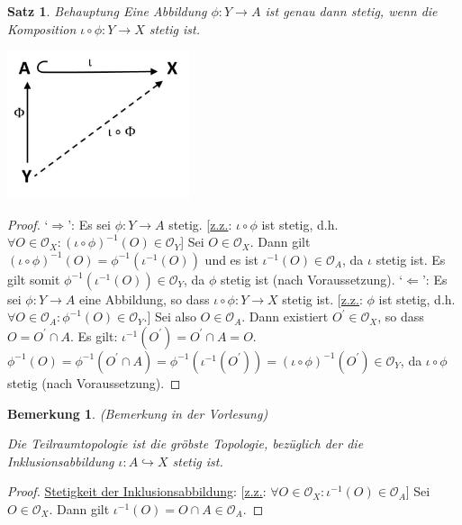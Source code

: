 \documentclass[a4paper,11pt,notitlepage]{report}
\newtheorem{theorem}{Satz}[chapter]
\newtheorem{remark}{Bemerkung}[chapter]
\newcommand{\OO}{{\ensuremath{\mathcal{O}}}}
\begin{document}
\begin{theorem}{Behauptung}
Eine Abbildung $\phi \colon Y \rightarrow A$ ist genau dann stetig, wenn die Komposition $\iota \circ \phi \colon Y \rightarrow X$ stetig ist.
\end{theorem}
\includegraphics[width=0.4\textwidth]{images/Universell_Diagramm.jpg}
\begin{proof}
`$\Rightarrow$': Es sei $\phi \colon Y \rightarrow A$ stetig. [\underline{z.z.}: $\iota \circ \phi$ ist stetig, d.h. $\forall O \in \OO_X \colon (\iota \circ \phi)^{-1}(O) \in \OO_Y$]
\newline
Sei $O \in \OO_X$. Dann gilt $(\iota \circ \phi)^{-1}(O) = \phi^{-1}\left(\iota^{-1}(O)\right)$ und es ist $\iota^{-1}(O) \in \OO_A$, da $\iota$ stetig ist.
\newline
Es gilt somit $\phi^{-1}\left(\iota^{-1}(O)\right) \in \OO_Y$, da $\phi$ stetig ist (nach Voraussetzung).
\newline
`$\Leftarrow$': Es sei $\phi \colon Y \rightarrow A$ eine Abbildung, so dass $\iota \circ \phi \colon Y \rightarrow X$ stetig ist. [\underline{z.z.}: $\phi$ ist stetig, d.h. $\forall O \in \OO_A \colon \phi^{-1}(O) \in \OO_Y$.]
\newline
Sei also $O \in \OO_A$. Dann existiert $O^\prime \in \OO_X$, so dass $O = O^\prime \cap A$.
Es gilt: $\iota^{-1}(O^\prime) = O^\prime \cap A = O$.
\newline
$\phi^{-1}(O) = \phi^{-1}(O^\prime \cap A) = \phi^{-1}\left(\iota^{-1}(O^\prime)\right) = (\iota \circ \phi)^{-1}(O^\prime) \in \OO_Y$, da $\iota \circ \phi$ stetig (nach Voraussetzung).
\end{proof}

\begin{remark}{(Bemerkung in der Vorlesung)}

Die Teilraumtopologie ist die gröbste Topologie, bezüglich der die Inklusionsabbildung $\iota \colon A \hookrightarrow X$ stetig ist.
\end{remark}

\begin{proof}
\underline{Stetigkeit der Inklusionsabbildung}: [\underline{z.z.}: $\forall O \in \OO_X \colon \iota^{-1}(O) \in \OO_A$]
\newline
Sei $O \in \OO_X$. Dann gilt $\iota^{-1}(O)=O \cap A \in \OO_A$.
\end{proof}
\end{document}
